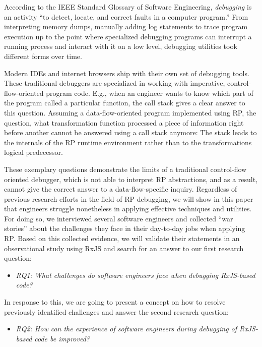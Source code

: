 \documentclass[sigplan,screen,review]{acmart}
\begin{document}
According to the IEEE Standard Glossary of Software Engineering, \emph{debugging} is an activity ``to detect, locate, and correct faults in a computer program.''\cite{ieeeglossary} From interpreting memory dumps, manually adding log statements to trace program execution up to the point where specialized debugging programs can interrupt a running process and interact with it on a low level, debugging utilities took different forms over time.

Modern IDEs and internet browsers ship with their own set of debugging tools. These traditional debuggers are specialized in working with imperative, control-flow-oriented program code. E.g., when an engineer wants to know which part of the program called a particular function, the call stack gives a clear answer to this question. Assuming a data-flow-oriented program implemented using RP, the question, what transformation function processed a piece of information right before another cannot be answered using a call stack anymore: The stack leads to the internals of the RP runtime environment rather than to the transformations logical predecessor.

These exemplary questions demonstrate the limits of a traditional control-flow oriented debugger, which is not able to interpret RP abstractions, and as a result, cannot give the correct answer to a data-flow-specific inquiry. Regardless of previous research efforts \cite{10.1145/2577080.2577083} \cite{10.1145/2884781.2884815} \cite{10.1145/3180155.3180156} in the field of RP debugging, we will show in this paper that engineers struggle nonetheless in applying effective techniques and utilities. For doing so, we interviewed several software engineers and collected ``war stories'' about the challenges they face in their day-to-day jobs when applying RP. Based on this collected evidence, we will validate their statements in an observational study using RxJS and search for an answer to our first research question:

\begin{itemize}
	\item \emph{RQ1: What challenges do software engineers face when debugging RxJS-based code?}
\end{itemize}

In response to this, we are going to present a concept on how to resolve previously identified challenges and answer the second research question:

\begin{itemize}
	\item \emph{RQ2: How can the experience of software engineers during debugging of RxJS-based code be improved?}
\end{itemize}
\end{document}
